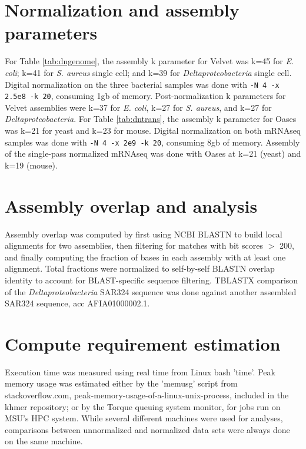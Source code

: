 \documentclass{pnastwo}
\begin{document}
\begin{article}
\begin{materials}
\section{Normalization and assembly parameters}

For Table \ref{tab:dngenome}, the assembly k parameter for Velvet was
k=45 for {\em E. coli}; k=41 for {\em S. aureus} single cell; and k=39
for {\em Deltaproteobacteria} single cell.  Digital normalization
on the three bacterial samples was done with {\tt -N 4 -x 2.5e8 -k 20},
consuming 1gb of memory.  Post-normalization k parameters for Velvet
assemblies were k=37 for {\em E. coli}, k=27 for {\em S. aureus}, and k=27 for {\em Deltaproteobacteria}.
For Table \ref{tab:dntrans}, the assembly k parameter for Oases was k=21 for yeast
and k=23 for mouse.  Digital normalization on both mRNAseq samples was done
with {\tt -N 4 -x 2e9 -k 20}, consuming 8gb of memory.  Assembly of the
single-pass normalized mRNAseq was done with Oases at k=21 (yeast) and k=19
(mouse).

\section{Assembly overlap and analysis}

Assembly overlap was computed by first using NCBI BLASTN to build local
alignments for two assemblies, then filtering for matches with bit scores
$>$ 200, and finally computing the fraction of bases in each assembly
with at least one alignment.  Total fractions were normalized to
self-by-self BLASTN overlap identity to account for BLAST-specific
sequence filtering.
TBLASTX comparison of the {\em Deltaproteobacteria} SAR324 sequence
was done against another assembled SAR324 sequence, acc AFIA01000002.1.

\section{Compute requirement estimation}

Execution time was measured using real time from Linux bash 'time'.
Peak memory usage was estimated either by the 'memusg' script from
stackoverflow.com, peak-memory-usage-of-a-linux-unix-process, included
in the khmer repository; or by the Torque queuing system monitor, for
jobs run on MSU's HPC system.  While several different machines were
used for analyses, comparisons between unnormalized and normalized
data sets were always done on the same machine.

\end{materials}


\end{article}
\end{document}
